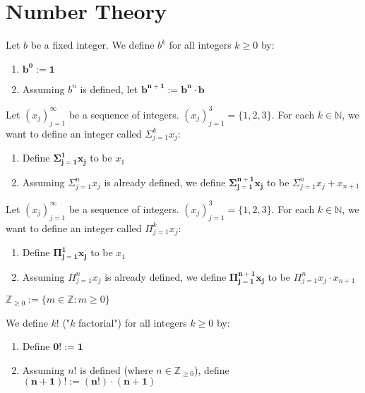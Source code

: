 \section*{Number Theory}

Let $b$ be a fixed integer. We define $b^k$ for all integers $k \geq 0$ by:
\begin{enumerate}
    \item $\boldsymbol{b^0 := 1}$
    \item Assuming $b^n$ is defined, let $\boldsymbol{b^{n+1} := b^n \cdot b}$
\end{enumerate}

Let $(x_j)_{j=1}^{\infty}$ be a sequence of integers. $(x_j)_{j=1}^3 = \{1,2,3\}$. For each $k \in \mathbb{N}$, we want to define an integer called $\Sigma_{j=1}^k x_j$:
\begin{enumerate}[label=\textbf{\arabic*.}]
    \item Define $\mathbf{\Sigma_{j=1}^1 x_j}$ to be $x_1$
    \item Assuming $\Sigma_{j=1}^n x_j$ is already defined, we define $\mathbf{\Sigma_{j=1}^{n+1} x_j}$ to be $\Sigma_{j=1}^n x_j + x_{n+1}$
\end{enumerate}

Let $(x_j)_{j=1}^{\infty}$ be a sequence of integers. $(x_j)_{j=1}^3 = \{1,2,3\}$. For each $k \in \mathbb{N}$, we want to define an integer called $\Pi_{j=1}^k x_j$:
\begin{enumerate}[label=\textbf{\arabic*.}]
    \item Define $\mathbf{\Pi_{j=1}^1 x_j}$ to be $x_1$
    \item Assuming $\Pi_{j=1}^n x_j$ is already defined, we define $\mathbf{\Pi_{j=1}^{n+1} x_j}$ to be $\Pi_{j=1}^n x_j \cdot x_{n+1}$
\end{enumerate}

$\mathbb{Z}_{\geq 0} := \{m \in \mathbb{Z} : m \geq 0\}$

We define $k!$ ("$k$ factorial") for all integers $k \geq 0$ by:
\begin{enumerate}[label=\textbf{\arabic*.}]
    \item Define $\mathbf{0! := 1}$
    \item Assuming $n!$ is defined (where $n \in \mathbb{Z}_{\geq 0}$), define $\mathbf{(n+1)! := (n!) \cdot (n+1)}$
\end{enumerate}

